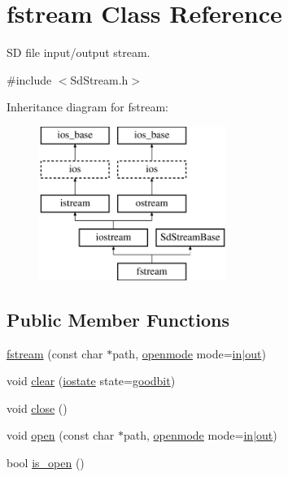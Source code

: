 \hypertarget{classfstream}{}\section{fstream Class Reference}
\label{classfstream}


SD file input/output stream.  




{\ttfamily \#include $<$Sd\+Stream.\+h$>$}

Inheritance diagram for fstream\+:\begin{figure}[H]
\begin{center}
\leavevmode
\includegraphics[height=5.000000cm]{classfstream}
\end{center}
\end{figure}
\subsection*{Public Member Functions}
\begin{DoxyCompactItemize}
\item 
\hyperlink{classfstream_aed23877c52f828cab8de7a23603b3b6c}{fstream} (const char $\ast$path, \hyperlink{classios__base_aaa192ec0dccc43050715553a34644523}{openmode} mode=\hyperlink{classios__base_ae5432e3c269064480652c4602f5f74ad}{in}$\vert$\hyperlink{classios__base_a4c1d517774c0d11af3424e90395f26ae}{out})
\item 
void \hyperlink{classfstream_a682b278a6a299ffb21b8737717ff12bf}{clear} (\hyperlink{classios__base_aef19291eeae0f072ac42c6ba1fe3033c}{iostate} state=\hyperlink{classios__base_a07a00996a6e525b88bdfe7935d5ead05}{goodbit})
\item 
void \hyperlink{classfstream_ac5720ee620c09d63dd186823e688ea9a}{close} ()
\item 
void \hyperlink{classfstream_a85b24d94552991f33caf4c3a83420879}{open} (const char $\ast$path, \hyperlink{classios__base_aaa192ec0dccc43050715553a34644523}{openmode} mode=\hyperlink{classios__base_ae5432e3c269064480652c4602f5f74ad}{in}$\vert$\hyperlink{classios__base_a4c1d517774c0d11af3424e90395f26ae}{out})
\item 
bool \hyperlink{classfstream_ae4a71c6f3da2f168ec222739d796fc8b}{is\+\_\+open} ()
\end{DoxyCompactItemize}
